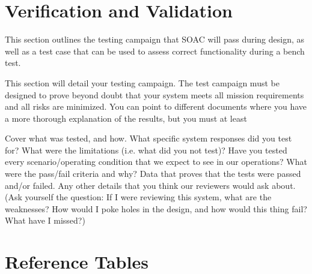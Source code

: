 \documentclass[10pt]{article}
\begin{document}

\section{Verification and Validation}\label{sec:v_and_v}

This section outlines the testing campaign that SOAC will pass during design, as well as a test case that can be used to assess correct functionality during a bench test.

This section will detail your testing campaign. The test campaign must be designed to prove beyond doubt that your system meets all mission requirements and all risks are minimized. You can point to different documents where you have a more thorough explanation of the results, but you must at least

Cover what was tested, and how. What specific system responses did you test for? What were the limitations (i.e. what did you not test)? Have you tested every scenario/operating condition that we expect to see in our operations?  What were the pass/fail criteria and why?
Data that proves that the tests were passed and/or failed. 
Any other details that you think our reviewers would ask about. (Ask yourself the question: If I were reviewing this system, what are the weaknesses? How would I poke holes in the design, and how would this thing fail? What have I missed?)


\clearpage
\section*{Reference Tables}
\end{document}
